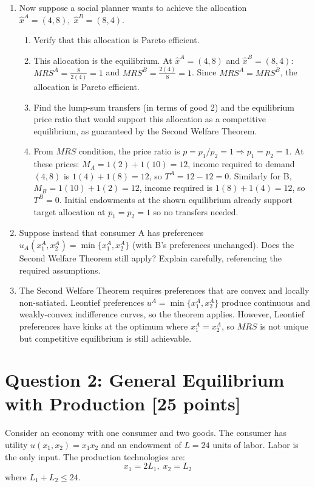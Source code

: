 \documentclass[11pt]{article}
\begin{document}
\begin{enumerate}[label=(\alph*)]
\item[ (d) ] [6 points] Now suppose a social planner wants to achieve the allocation $\hat{x}^A = (4,8), \; \hat{x}^B = (8,4)$.

\begin{enumerate}[label=(\roman*)]
\item Verify that this allocation is Pareto efficient.
\item[] This allocation is the equilibrium. At $\hat{x}^A=(4,8)$ and $\hat{x}^B=(8,4)$: $MRS^A=\frac{8}{2(4)}=1$ and $MRS^B=\frac{2(4)}{8}=1$. Since $MRS^A=MRS^B$, the allocation is Pareto efficient.
\item Find the lump-sum transfers (in terms of good 2) and the equilibrium price ratio that would support this allocation as a competitive equilibrium, as guaranteed by the Second Welfare Theorem.
\item[] From $MRS$ condition, the price ratio is $p=p_1/p_2=1\Rightarrow p_1=p_2=1$. At these prices: $M_A=1(2)+1(10)=12$, income required to demand $(4,8)$ is $1(4)+1(8)=12$, so $T^A=12-12=0$. Similarly for B, $M_B=1(10)+1(2)=12$, income required is $1(8)+1(4)=12$, so $T^B=0$. Initial endowments at the shown equilibrium already support target allocation at $p_1=p_2=1$ so no transfers needed.
\end{enumerate}

\item[ (e) ] [6 points] Suppose instead that consumer A has preferences
$u_A(x_1^A, x_2^A) = \min\{x_1^A, x_2^A\}$
(with B's preferences unchanged). Does the Second Welfare Theorem still apply? Explain carefully, referencing the required assumptions.
\item[] The Second Welfare Theorem requires preferences that are convex and locally non-satiated. Leontief preferences $u^A=\min\{x_1^A,x_2^A\}$ produce continuous and weakly-convex indifference curves, so the theorem applies. However, Leontief preferences have kinks at the optimum where $x_1^A=x_2^A$, so $MRS$ is not unique but competitive equilibrium is still achievable.

\end{enumerate}

\bigskip

\section*{Question 2: General Equilibrium with Production [25 points]}

Consider an economy with one consumer and two goods. The consumer has utility
$u(x_1, x_2) = x_1 x_2$
and an endowment of $L = 24$ units of labor. Labor is the only input. The production technologies are: 
\[x_1 = 2L_1, \;x_2 = L_2\]
where $L_1 + L_2 \leq 24$.
\end{document}
